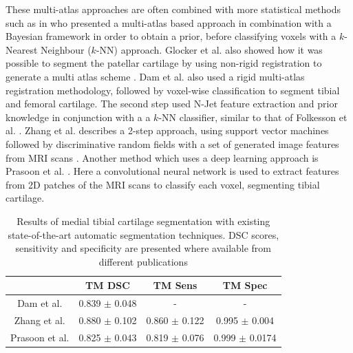 \documentclass[11pt,a4paper]{memoir}
\numberwithin{figure}{section}
\numberwithin{table}{section}
\numberwithin{equation}{section}
\begin{document}
These multi-atlas approaches are often combined with more statistical methods such as in \cite{Shan2012AUTOMATICIMAGES.} who presented a multi-atlas based approach in combination with a Bayesian framework in order to obtain a prior, before classifying voxels with a $k$-Nearest Neighbour ($k$-NN) approach. Glocker et al. also showed how it was possible to segment the patellar cartilage by using non-rigid registration to generate a multi atlas scheme \cite{Glocker2007}. Dam et al. \cite{Dam2015} also used a rigid multi-atlas registration methodology, followed by voxel-wise classification to segment tibial and femoral cartilage. The second step used N-Jet feature extraction and prior knowledge in conjunction with a a $k$-NN classifier, similar to that of Folkesson et al. \cite{Folkesson2007}. Zhang et al. \cite{Zhang} describes a 2-step approach, using support vector machines followed by discriminative random fields with a set of generated image features from MRI scans \cite{Zhang}. Another method which uses a deep learning approach is Prasoon et al. \cite{Prasoon2013DeepNetwork}. Here a convolutional neural network is used to extract features from 2D patches of the MRI scans to classify each voxel, segmenting tibial cartilage. \\

\begin{table}[!h]
\centering

\caption[State-of-the-Art segmentation accuracies]{Results of medial tibial cartilage segmentation with existing state-of-the-art automatic segmentation techniques. DSC scores, sensitivity and specificity are presented where available from different publications}

\begin{tabular}{|c|c|c|c|}
\hline

		      & TM DSC   & TM Sens & TM Spec \\ \hline
Dam et al. \cite{Dam2015}    & 0.839 $\pm$ 0.048   &  -   & - \\ \hline
Zhang et al. \cite{Zhang}  & 0.880 $\pm$ 0.102   & 0.860 $\pm$ 0.122 &  0.995 $\pm$ 0.004\\ \hline
Prasoon et al. \cite{Prasoon2013DeepNetwork} & 0.825 $\pm$ 0.043 &   0.819 $\pm$ 0.076   &   0.999 $\pm$ 0.0174  \\ \hline
\end{tabular}

\label{SOA}

\end{table}
\end{document}
